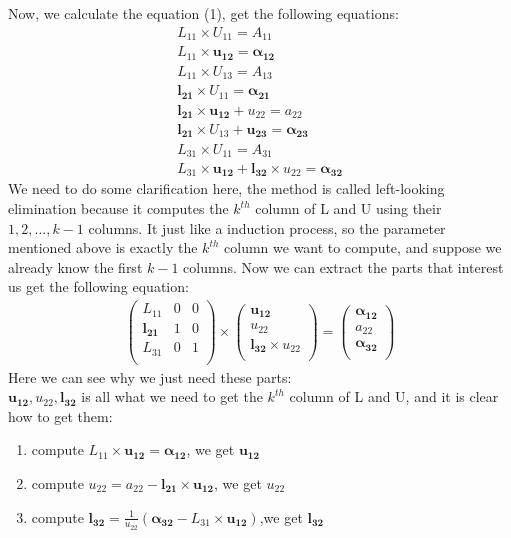 \documentclass[11pt]{article}
\begin{document}
Now, we calculate the equation (1), get the following equations:
\begin{gather}
    L_{11}\times U_{11} = A_{11}\\
    L_{11}\times \pmb{u_{12}} = \pmb{\alpha_{12}}\\
    L_{11}\times U_{13} = A_{13}\\
    \pmb{l_{21}} \times U_{11} = \pmb{\alpha_{21}}\\
    \pmb{l_{21}} \times  \pmb{u_{12}} + u_{22} = a_{22}\\
    \pmb{l_{21}} \times U_{13} + \pmb{u_{23}} = \pmb{\alpha_{23}}\\
    L_{31}\times U_{11} = A_{31}\\
    L_{31}\times \pmb{u_{12}} +\pmb{l_{32}}\times u_{22} = \pmb{\alpha_{32}}
\end{gather}
We need to do some clarification here, the method is called left-looking elimination because it computes the $k^{th}$ column of L and U using their $1,2,...,k-1$ columns. It just like a induction process, so the parameter mentioned above is exactly the $k^{th}$ column we want to compute, and suppose we already know the first $k-1$ columns. Now we can extract the parts that interest us get the following equation:
\begin{gather}
    \left( \begin{array}{ccc} L_{11} & 0  & 0\\ \pmb{l_{21}} & 1  & 0\\  L_{31} & 0  & 1\\ \end{array} \right) \times\left( \begin{array}{ccc} \pmb{u_{12}}   \\ u_{22}   \\  \pmb{l_{32}}\times u_{22} \\ \end{array} \right) = \left( \begin{array}{ccc}  \pmb{\alpha_{12}} \\ a_{22}\\ \pmb{\alpha_{32}}  \\ \end{array} \right)
    \label{equation:2}
\end{gather}
Here we can see why we just need these parts: \\
$\pmb{u_{12}},u_{22},\pmb{l_{32}}$ is all what we need to get the $k^{th}$ column of L and U, and it is clear how to get them:
\begin{enumerate}
    \item compute $L_{11}\times \pmb{u_{12}} = \pmb{\alpha_{12}}$, we get $\pmb{u_{12}}$
    \item compute $  u_{22} = a_{22} - \pmb{l_{21}} \times  \pmb{u_{12}}$, we get $u_{22}$
    \item compute  $ \pmb{l_{32}}  =\frac{1}{u_{22}}( \pmb{\alpha_{32}} - L_{31}\times \pmb{u_{12}})$,we get $ \pmb{l_{32}}$
\end{enumerate}
\end{document}
